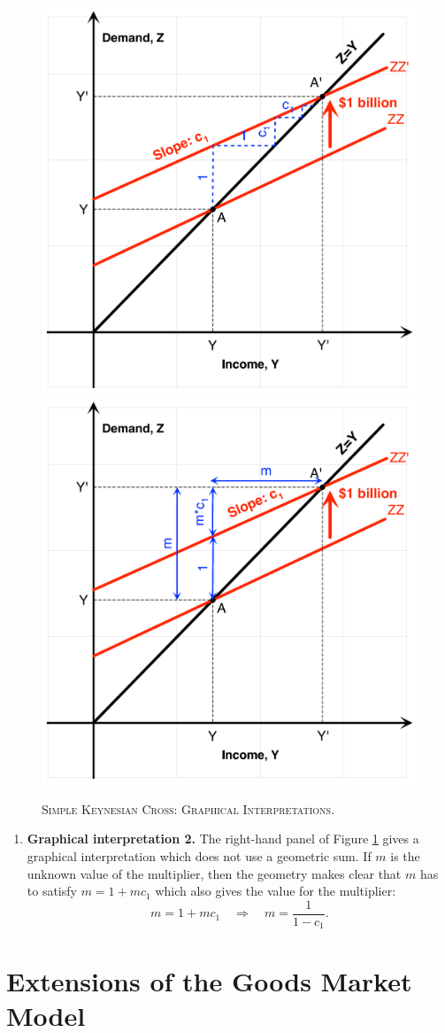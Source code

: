 \documentclass[]{book}
\providecommand{\tightlist}{%
  \setlength{\itemsep}{0pt}\setlength{\parskip}{0pt}}
\theoremstyle{definition}
\theoremstyle{definition}
\theoremstyle{definition}
\theoremstyle{remark}
\begin{document}
\begin{figure}

{\centering \includegraphics[width=0.49\linewidth,height=0.49\textheight]{graphsketcher/keynesian-cross} \includegraphics[width=0.49\linewidth,height=0.49\textheight]{graphsketcher/keynesian-cross2} 

}

\caption{\textsc{Simple Keynesian Cross: Graphical
Interpretations}.}\label{fig:keynes-graphical}
\end{figure}

\begin{enumerate}
\def\labelenumi{\arabic{enumi}.}
\setcounter{enumi}{3}
\tightlist
\item
  \textbf{Graphical interpretation 2.} The right-hand panel of Figure
  \ref{fig:keynes-graphical} gives a graphical interpretation which does
  not use a geometric sum. If \(m\) is the unknown value of the
  multiplier, then the geometry makes clear that \(m\) has to satisfy
  \(m=1+mc_{1}\) which also gives the value for the multiplier:
  \[m=1+mc_{1} \quad\Rightarrow\quad m=\frac{1}{1-c_{1}}.\]
\end{enumerate}

\section{Extensions of the Goods Market Model}\label{variations}
\end{document}
